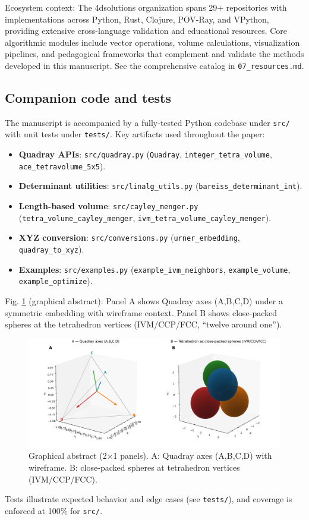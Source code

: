 \documentclass[
]{article}
\providecommand{\tightlist}{%
  \setlength{\itemsep}{0pt}\setlength{\parskip}{0pt}}
\begin{document}
Ecosystem context: The 4dsolutions organization spans 29+ repositories
with implementations across Python, Rust, Clojure, POV-Ray, and VPython,
providing extensive cross-language validation and educational resources.
Core algorithmic modules include vector operations, volume calculations,
visualization pipelines, and pedagogical frameworks that complement and
validate the methods developed in this manuscript. See the comprehensive
catalog in \texttt{07\_resources.md}.

\hypertarget{companion-code-and-tests}{%
\subsection{Companion code and tests}\label{companion-code-and-tests}}

The manuscript is accompanied by a fully-tested Python codebase under
\texttt{src/} with unit tests under \texttt{tests/}. Key artifacts used
throughout the paper:

\begin{itemize}
\tightlist
\item
  \textbf{Quadray APIs}: \texttt{src/quadray.py} (\texttt{Quadray},
  \texttt{integer\_tetra\_volume}, \texttt{ace\_tetravolume\_5x5}).
\item
  \textbf{Determinant utilities}: \texttt{src/linalg\_utils.py}
  (\texttt{bareiss\_determinant\_int}).
\item
  \textbf{Length-based volume}: \texttt{src/cayley\_menger.py}
  (\texttt{tetra\_volume\_cayley\_menger},
  \texttt{ivm\_tetra\_volume\_cayley\_menger}).
\item
  \textbf{XYZ conversion}: \texttt{src/conversions.py}
  (\texttt{urner\_embedding}, \texttt{quadray\_to\_xyz}).
\item
  \textbf{Examples}: \texttt{src/examples.py}
  (\texttt{example\_ivm\_neighbors}, \texttt{example\_volume},
  \texttt{example\_optimize}).
\end{itemize}

Fig. \ref{fig:graphical_abstract} (graphical abstract): Panel A shows
Quadray axes (A,B,C,D) under a symmetric embedding with wireframe
context. Panel B shows close-packed spheres at the tetrahedron vertices
(IVM/CCP/FCC, ``twelve around one'').

\begin{figure}
\hypertarget{fig:graphical_abstract}{%
\centering
\includegraphics{../output/figures/graphical_abstract_quadray.png}
\caption{Graphical abstract (2×1 panels). A: Quadray axes (A,B,C,D) with
wireframe. B: close-packed spheres at tetrahedron vertices
(IVM/CCP/FCC).}\label{fig:graphical_abstract}
}
\end{figure}

Tests illustrate expected behavior and edge cases (see \texttt{tests/}),
and coverage is enforced at 100\% for \texttt{src/}.
\end{document}

